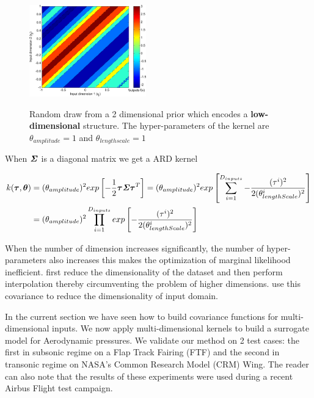 \begin{figure}[!ht]
  \centering
   \includegraphics[width=0.45\textwidth]
        {images/part2/drawsLowMultiDimensional}
        \label{subFigdrawsLowMultiDimensional}
  \caption{Random draw from a 2 dimensional prior which encodes a \textbf{low-dimensional} structure. The hyper-parameters of the kernel are $\theta_{amplitude}=1$ and $\theta_{lengthscale}=1$}
\end{figure}

When $\bm{\mathit{\Sigma}}$ is a diagonal matrix we get a ARD kernel

\begin{equation}
\begin{aligned}
k(\boldsymbol{\tau}, \boldsymbol{\theta}) & = (\theta_{amplitude})^2  exp\left [  -\frac{1}{2} \boldsymbol{\tau} \bm{\mathit{\Sigma}} \boldsymbol{\tau}^T \right ] = 
(\theta_{amplitude})^2  exp\left [ \sum_{i=1}^{D_{inputs}} -\frac{(\tau^{i})^2}{2(\theta_{lengthScale}^{i})^2} \right ] \\
& = (\theta_{amplitude})^2 \prod_{i=1}^{D_{inputs}}  exp\left [ -\frac{(\tau^{i})^2}{2(\theta_{lengthScale}^{i})^2} \right ]
\end{aligned}
\end{equation}

When the number of dimension increases significantly, the number of hyper-parameters also increases this makes the optimization of marginal likelihood inefficient. \cite{bouhlel2016improved} first reduce the dimensionality of the dataset and then perform interpolation thereby circumventing the problem of higher dimensions. \cite{garnett2013active, tripathy2016gaussian} use this covariance to reduce the dimensionality of input domain.

In the current section we have seen how to build covariance functions for multi-dimensional inputs. We now apply multi-dimensional kernels to build a surrogate model for Aerodynamic pressures. We validate our method on 2 test cases: the first in subsonic regime on a Flap Track Fairing (FTF) and the second in transonic regime on NASA's Common Research Model (CRM) Wing. The reader can also note that the results of these experiments were used during a recent Airbus Flight test campaign.


